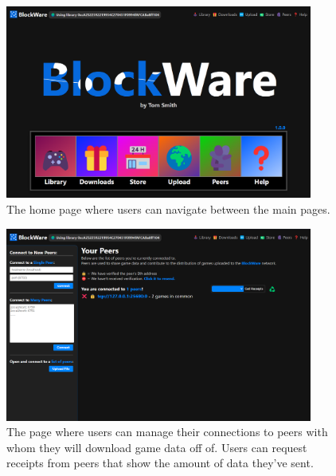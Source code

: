 \begin{figure}[H]
  \centering
  \includegraphics[width=0.9\textwidth]{assets/images/screenshots/home.png}
  \caption{The home page where users can navigate between the main pages.}
\end{figure}

\begin{figure}[H]
  \centering
  \includegraphics[width=0.9\textwidth]{assets/images/screenshots/peers.png}
  \caption{The page where users can manage their connections to peers with whom they will download game data off of. Users can request receipts from peers that show the amount of data they've sent.}
\end{figure}


